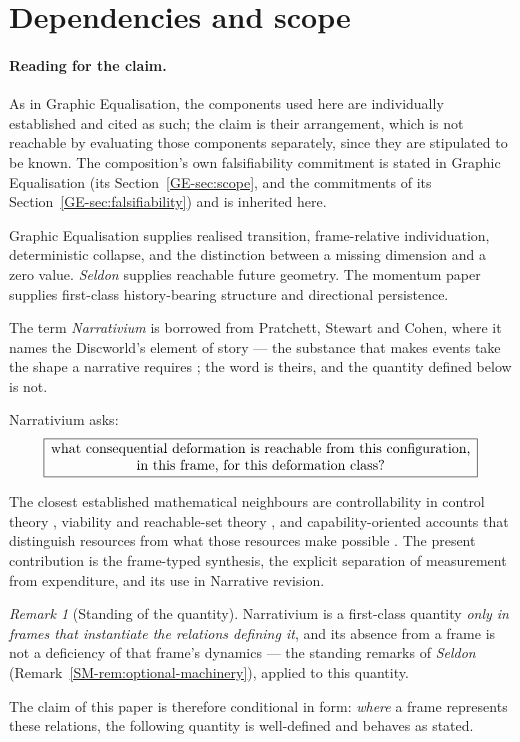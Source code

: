 \documentclass[11pt,a4paper]{article}
\theoremstyle{remark}
\newtheorem{remark}[definition]{Remark}
\begin{document}
\section{Dependencies and scope}\label{sec:dependencies}

\paragraph{Reading for the claim.}
As in Graphic Equalisation, the components used here are individually established and cited as such; the claim is their arrangement, which is not reachable by evaluating those components separately, since they are stipulated to be known. The composition's own falsifiability commitment is stated in Graphic Equalisation (its Section~\ref{GE-sec:scope}, and the commitments of its Section~\ref{GE-sec:falsifiability}) and is inherited here.

Graphic Equalisation supplies realised transition, frame-relative individuation, deterministic collapse, and the distinction between a missing dimension and a zero value. \emph{Seldon} supplies reachable future geometry. The momentum paper supplies first-class history-bearing structure and directional persistence.

The term \emph{Narrativium} is borrowed from Pratchett, Stewart and Cohen, where it names the
Discworld's element of story --- the substance that makes events take the shape a narrative requires
\citep{pratchett1999science}; the word is theirs, and the quantity defined below is not.

Narrativium asks:
\[
\boxed{\parbox{0.88\textwidth}{\centering what consequential deformation is reachable from this configuration, in this frame, for this deformation class?}}
\]

The closest established mathematical neighbours are controllability in control theory \citep{kalman1960control}, viability and reachable-set theory \citep{aubin1991viability,aubin1990survey}, and capability-oriented accounts that distinguish resources from what those resources make possible \citep{sen1985commodities}. The present contribution is the frame-typed synthesis, the explicit separation of measurement from expenditure, and its use in Narrative revision.

\begin{remark}[Standing of the quantity]\label{rem:narrativium-standing}
Narrativium is a first-class quantity \emph{only in frames that instantiate the relations defining it}, and its absence from a frame is not a deficiency of that frame's dynamics --- the standing remarks of \emph{Seldon} (Remark~\ref{SM-rem:optional-machinery}), applied to this quantity.

The claim of this paper is therefore conditional in form: \emph{where} a frame represents these relations, the following quantity is well-defined and behaves as stated.
\end{remark}
\end{document}
